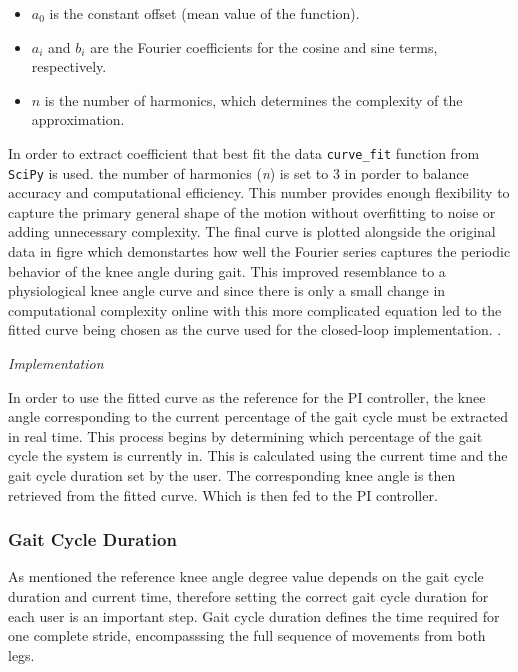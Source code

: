 \begin{itemize}
    \item \(a_0\) is the constant offset (mean value of the function).
    \item \(a_i\) and \(b_i\) are the Fourier coefficients for the cosine and sine terms, respectively.
    \item \(n\) is the number of harmonics, which determines the complexity of the approximation.
\end{itemize}

In order to extract coefficient that best fit the data \texttt{curve\_fit}  function from \texttt{SciPy} is used. the number of harmonics (\textit{n}) is set to 3 in porder to balance accuracy and computational efficiency. This number provides enough flexibility to capture the primary general shape of the motion without overfitting to noise or adding unnecessary complexity. The  final curve is plotted alongside the original data in figre  which demonstartes how well the Fourier series captures the periodic behavior of the knee angle during gait. This improved resemblance to a physiological knee angle curve and since there is only a small change in computational complexity online with this more complicated equation led to the fitted curve being chosen as the curve used for the closed-loop implementation.
.
\newline

\textit{Implementation}

In order to use the fitted curve as the reference for the PI controller, the knee angle corresponding to the current percentage of the gait cycle must be extracted in real time. This process begins by determining which percentage of the gait cycle the system is currently in. This is calculated using the current time and the gait cycle duration set by the user. The corresponding knee angle is then retrieved from the fitted curve. Which is then fed to the PI controller.

\subsubsection{Gait Cycle Duration}
As mentioned the reference knee angle degree value depends on the gait cycle duration and current time, therefore setting the correct gait cycle duration for each user is an important step. Gait cycle duration defines the time required for one complete stride, encompasssing the full sequence of movements from both legs. 

